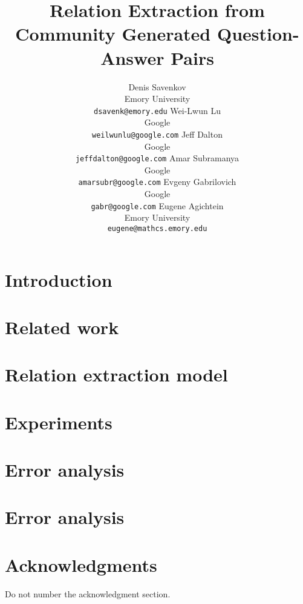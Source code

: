 \documentclass[11pt,letterpaper]{article}
\title{Relation Extraction from Community Generated Question-Answer Pairs}
\author{
Denis Savenkov\\
Emory University\Thanks{Research done during an internship at Google}\\
{\tt dsavenk@emory.edu}
\And
Wei-Lwun Lu\\
Google\\
{\tt weilwunlu@google.com}
\And
Jeff Dalton\\
Google\\
{\tt jeffdalton@google.com}
\AND
Amar Subramanya\\
Google\\
{\tt amarsubr@google.com}
\And
Evgeny Gabrilovich\\
Google\\
{\tt gabr@google.com}
\And
Eugene Agichtein\\
Emory University\\
{\tt eugene@mathcs.emory.edu}}
\date{}
\begin{document}
\maketitle

\begin{abstract}

\end{abstract}

\section{Introduction}
\label{sec:intro}


\section{Related work}
\label{sec:relatedwork}


\section{Relation extraction model}
\label{sec:model}


\section{Experiments}
\label{sec:experiments}


\section{Error analysis}
\label{sec:analysis}


\section{Error analysis}
\label{sec:conclusion}


\section*{Acknowledgments}

Do not number the acknowledgment section.


\end{document}

